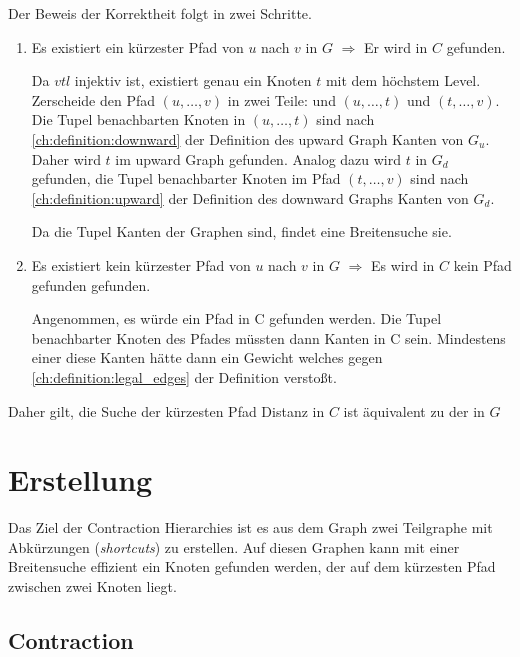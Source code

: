 \begin{beweis}
    Der Beweis der Korrektheit folgt in zwei Schritte.

    \begin{enumerate}
        \item
              Es existiert ein kürzester Pfad von $u$ nach $v$ in $G$ $\Rightarrow$ Er wird in $C$ gefunden.

              Da ${vtl}$ injektiv ist, existiert genau ein Knoten $t$ mit dem höchstem Level. Zerscheide den Pfad $(u, \dotsc, v)$ in zwei Teile:  und $(u, \dotsc, t)$ und $(t, \dotsc, v)$. Die Tupel benachbarten Knoten in $(u, \dotsc, t)$ sind nach \autoref{ch:definition:downward} der Definition des upward Graph Kanten von $G_u$. Daher wird $t$ im upward Graph gefunden. Analog dazu wird $t$ in $G_d$ gefunden, die Tupel benachbarter Knoten im Pfad $(t, \dotsc, v)$ sind nach \autoref{ch:definition:upward} der Definition des downward Graphs Kanten von $G_d$.

              Da die Tupel Kanten der Graphen sind, findet eine Breitensuche sie.

        \item
              Es existiert kein kürzester Pfad von $u$ nach $v$ in $G$ $\Rightarrow$ Es wird in $C$ kein Pfad gefunden gefunden.

              Angenommen, es würde ein Pfad in C gefunden werden. Die Tupel benachbarter Knoten des Pfades müssten dann Kanten in C sein.
              Mindestens einer diese Kanten hätte dann ein Gewicht welches gegen \autoref{ch:definition:legal_edges} der Definition verstoßt.
    \end{enumerate}

    Daher gilt, die Suche der kürzesten Pfad Distanz in $C$ ist äquivalent zu der in $G$
\end{beweis}

\section{Erstellung}

Das Ziel der Contraction Hierarchies ist es aus dem Graph zwei Teilgraphe mit Abkürzungen (\emph{shortcuts}) zu erstellen.
Auf diesen Graphen kann mit einer Breitensuche effizient ein Knoten gefunden werden, der auf dem kürzesten Pfad zwischen zwei Knoten liegt.

\subsection{Contraction}


